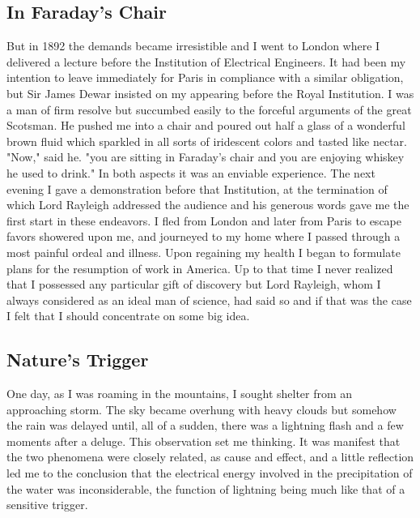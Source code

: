 \documentclass[a4paper,12pt,english,twoside,openright]{memoir}
\begin{document}
\subsection{In Faraday's Chair}
But in 1892 the demands became irresistible and I went to London where I delivered a lecture 
before the Institution of Electrical Engineers.  It had been my intention to leave immediately for 
Paris in compliance with a similar obligation, but Sir James Dewar insisted on my appearing 
before the Royal Institution.  I was a man of firm resolve but succumbed easily to the forceful 
arguments of the great Scotsman.  He pushed me into a chair and poured out half a glass of a 
wonderful brown fluid which sparkled in all sorts of iridescent colors and tasted like nectar.  
"Now," said he.  "you are sitting in Faraday's chair and you are enjoying whiskey he used to 
drink." In both aspects it was an enviable experience.  The next evening I gave a demonstration 
before that Institution, at the termination of which Lord Rayleigh addressed the audience and his 
generous words gave me the first start in these endeavors.  I fled from London and later from 
Paris to escape favors showered upon me, and journeyed to my home where I passed through a 
most painful ordeal and illness.  Upon regaining my health I began to formulate plans for the 
resumption of work in America.  Up to that time I never realized that I possessed any particular 
gift of discovery but Lord Rayleigh, whom I always considered as an ideal man of science, had 
said so and if that was the case I felt that I should concentrate on some big idea.  

\subsection{Nature's Trigger}
One day, as I was roaming in the mountains, I sought shelter from an approaching storm.  The 
sky became overhung with heavy clouds but somehow the rain was delayed until, all of a sudden, 
there was a lightning flash and a few moments after a deluge.  This observation set me thinking.  
It was manifest that the two phenomena were closely related, as cause and effect, and a little 
reflection led me to the conclusion that the electrical energy involved in the precipitation of the 
water was inconsiderable, the function of lightning being much like that of a sensitive trigger.  
\end{document}
